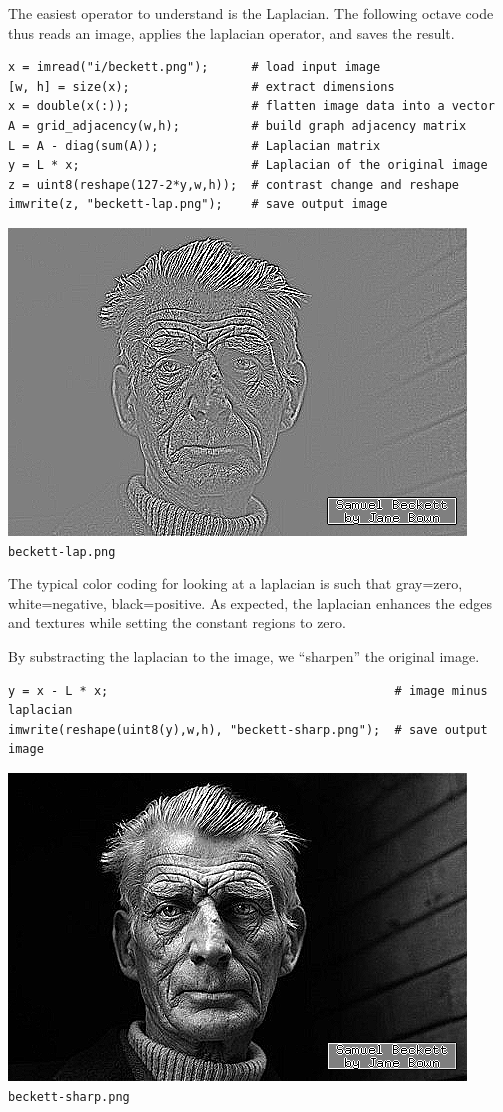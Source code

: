 The easiest operator to understand is the Laplacian.  The following octave
code thus reads an image, applies the laplacian operator, and saves the
result.

\begin{verbatim}
x = imread("i/beckett.png");      # load input image
[w, h] = size(x);                 # extract dimensions
x = double(x(:));                 # flatten image data into a vector
A = grid_adjacency(w,h);          # build graph adjacency matrix
L = A - diag(sum(A));             # Laplacian matrix
y = L * x;                        # Laplacian of the original image
z = uint8(reshape(127-2*y,w,h));  # contrast change and reshape
imwrite(z, "beckett-lap.png");    # save output image
\end{verbatim}


\includegraphics{beckett-lap.png}
\verb+beckett-lap.png+

The typical color coding for looking at a laplacian is such that gray=zero,
white=negative, black=positive.  As expected, the laplacian enhances the
edges and textures while setting the constant regions to zero.

By substracting the laplacian to the image, we ``sharpen'' the original image.

\begin{verbatim}
y = x - L * x;                                        # image minus laplacian
imwrite(reshape(uint8(y),w,h), "beckett-sharp.png");  # save output image
\end{verbatim}

\includegraphics{beckett-sharp.png}
\verb+beckett-sharp.png+

